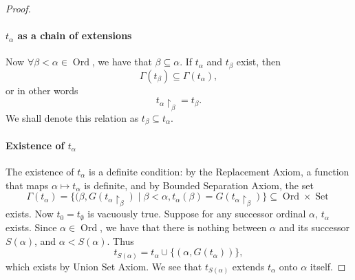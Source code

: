 \documentclass[notoc,notitlepage]{tufte-book}
\DeclareMathOperator{\Ord}{Ord }
\DeclareMathOperator{\Set}{Set }
\begin{document}
\begin{proof}
  \paragraph{$t_\alpha$ as a chain of extensions} Now $\forall \beta < \alpha \in \Ord$, we have that $\beta \subseteq \alpha$. If $t_\alpha$ and $t_\beta$ exist, then
  \begin{equation*}
    \Gamma(t_\beta) \subseteq \Gamma(t_\alpha),
  \end{equation*}
  or in other words
  \begin{equation*}
    t_\alpha \restriction_\beta = t_\beta.
  \end{equation*}
  We shall denote this relation as $t_\beta \subseteq t_\alpha$.

  \paragraph{Existence of $t_\alpha$} The existence of $t_\alpha$ is a definite condition: by the Replacement Axiom, a function that maps $\alpha \mapsto t_\alpha$ is definite, and by Bounded Separation Axiom, the set
  \begin{equation*}
    \Gamma(t_\alpha) = \{ (\beta, G(t_\alpha \restriction_\beta) \mid \beta < \alpha, t_\alpha(\beta) = G(t_\alpha \restriction_\beta) \} \subseteq \Ord \times \Set
  \end{equation*}
  exists. Now $t_0 = t_\emptyset$ is vacuously true. Suppose for any successor ordinal $\alpha$, $t_\alpha$ exists. Since $\alpha \in \Ord$, we have that there is nothing between $\alpha$ and its successor $S(\alpha)$, and $\alpha < S(\alpha)$. Thus
  \begin{equation*}
    t_{S(\alpha)} = t_\alpha \cup \{ (\alpha, G(t_\alpha)) \},
  \end{equation*}
  which exists by Union Set Axiom. We see that $t_{S(\alpha)}$ extends $t_\alpha$ onto $\alpha$ itself.


\end{proof}
\end{document}
